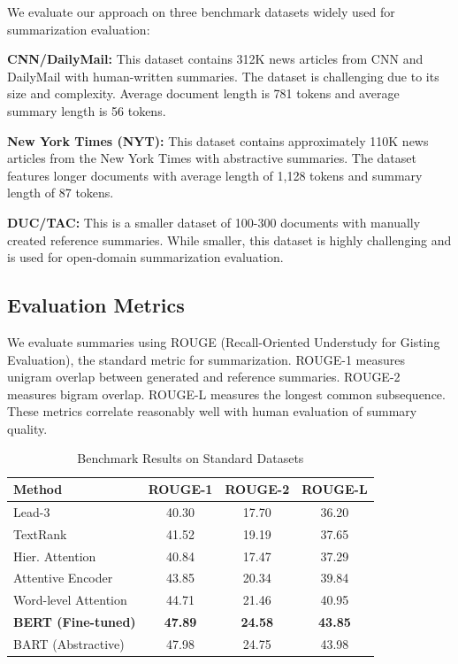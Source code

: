 \documentclass[conference]{IEEEtran}
\begin{document}
We evaluate our approach on three benchmark datasets widely used for summarization evaluation:

\noindent\textbf{CNN/DailyMail:} This dataset contains 312K news articles from CNN and DailyMail with human-written summaries. The dataset is challenging due to its size and complexity. Average document length is 781 tokens and average summary length is 56 tokens.

\noindent\textbf{New York Times (NYT):} This dataset contains approximately 110K news articles from the New York Times with abstractive summaries. The dataset features longer documents with average length of 1,128 tokens and summary length of 87 tokens.

\noindent\textbf{DUC/TAC:} This is a smaller dataset of 100-300 documents with manually created reference summaries. While smaller, this dataset is highly challenging and is used for open-domain summarization evaluation.

\subsection{Evaluation Metrics}

We evaluate summaries using ROUGE (Recall-Oriented Understudy for Gisting Evaluation), the standard metric for summarization. ROUGE-1 measures unigram overlap between generated and reference summaries. ROUGE-2 measures bigram overlap. ROUGE-L measures the longest common subsequence. These metrics correlate reasonably well with human evaluation of summary quality.

\begin{table}[h]
\centering
\caption{Benchmark Results on Standard Datasets}
\label{tab:results}
\begin{tabular}{|l|c|c|c|}
\hline
\textbf{Method} & \textbf{ROUGE-1} & \textbf{ROUGE-2} & \textbf{ROUGE-L} \\
\hline
Lead-3 & 40.30 & 17.70 & 36.20 \\
\hline
TextRank & 41.52 & 19.19 & 37.65 \\
\hline
Hier. Attention & 40.84 & 17.47 & 37.29 \\
\hline
Attentive Encoder & 43.85 & 20.34 & 39.84 \\
\hline
Word-level Attention & 44.71 & 21.46 & 40.95 \\
\hline
\textbf{BERT (Fine-tuned)} & \textbf{47.89} & \textbf{24.58} & \textbf{43.85} \\
\hline
BART (Abstractive) & 47.98 & 24.75 & 43.98 \\
\hline
\end{tabular}
\end{table}
\end{document}
